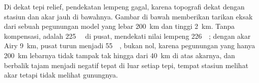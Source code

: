 Di dekat tepi relief, pendekatan lempeng gagal, karena topografi dekat dengan stasiun dan akar jauh di bawahnya. Gambar di bawah memberikan tarikan eksak dari sebuah pegunungan model yang lebar \qty{200}{km} dan tinggi \qty{2}{km}. Tanpa kompensasi,  adalah \qty{+225}{\milli\gal} di pusat, mendekati nilai lempeng \qty{226}{\milli\gal}; dengan akar Airy \qty{9}{km},  pusat turun menjadi \qty{+55}{\milli\gal}, bukan nol, karena pegunungan yang hanya \qty{200}{km} lebarnya tidak tampak tak hingga dari \qty{40}{km} di atas akarnya, dan  berbalik tajam menjadi negatif tepat di luar setiap tepi, tempat stasiun melihat akar tetapi tidak melihat gunungnya.

